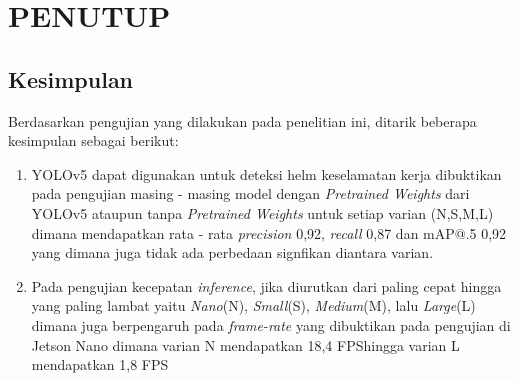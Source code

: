 \chapter{PENUTUP}
\label{chap:penutup}


\section{Kesimpulan}
\label{sec:kesimpulan}

\par Berdasarkan pengujian yang dilakukan pada penelitian ini, ditarik beberapa kesimpulan sebagai berikut:

\begin{enumerate}[nolistsep]
    \item YOLOv5 dapat digunakan untuk deteksi helm keselamatan kerja dibuktikan pada pengujian masing - masing model dengan \emph{Pretrained Weights} dari YOLOv5 ataupun tanpa \emph{Pretrained Weights} untuk setiap varian (N,S,M,L) dimana mendapatkan rata - rata \emph{precision} 0,92, \emph{recall}  0,87 dan mAP@.5 0,92 yang dimana juga tidak ada perbedaan signfikan diantara varian.

    \item Pada pengujian kecepatan \emph{inference}, jika diurutkan dari paling cepat hingga yang paling lambat yaitu \emph{Nano}(N), \emph{Small}(S), \emph{Medium}(M), lalu \emph{Large}(L) dimana juga berpengaruh pada \emph{frame-rate} yang dibuktikan pada pengujian di Jetson Nano dimana varian N mendapatkan 18,4 FPShingga varian L mendapatkan 1,8 FPS


\end{enumerate}
